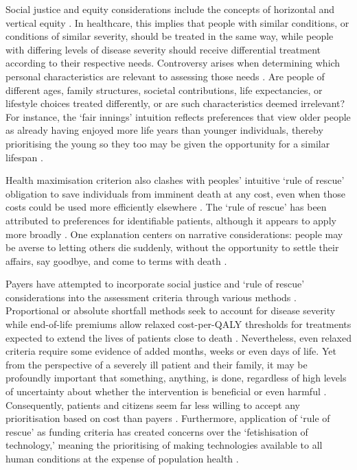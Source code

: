 \documentclass[11pt]{article}\usepackage[]{graphicx}\usepackage[]{xcolor}
\begin{document}
Social justice and equity considerations include the concepts of horizontal and vertical equity \parencite{ODonnell2008AnalyzingHealthEquity}. In healthcare, this implies that people with similar conditions, or conditions of similar severity, should be treated in the same way, while people with differing levels of disease severity should receive differential treatment according to their respective needs. Controversy arises when determining which personal characteristics are relevant to assessing those needs \parencite{ClarkWeale2012SocialValuesPrioritySetting}. Are people of different ages, family structures, societal contributions, life expectancies, or lifestyle choices treated differently, or are such characteristics deemed irrelevant? For instance, the ‘fair innings’ intuition reflects preferences that view older people as already having enjoyed more life years than younger individuals, thereby prioritising the young so they too may be given the opportunity for a similar lifespan \parencite{Oliver2009FairTestFairInnings, Watters2016FairInningsEmpiricalPerspective, Adler2025FairInnings}.

Health maximisation criterion also clashes with peoples’ intuitive ‘rule of rescue’ obligation to save individuals from imminent death at any cost, even when those costs could be used more efficiently elsewhere \parencite{Cookson2008RuleOfRescue, Sinclair2022a, Andrade2025EthicalShortcomingsQALY}. The ‘rule of rescue’ has been attributed to preferences for identifiable patients, although it appears to apply more broadly \parencite{McKie2003, Sinclair2022a}. One explanation centers on narrative considerations: people may be averse to letting others die suddenly, without the opportunity to settle their affairs, say goodbye, and come to terms with death \parencite{Sinclair2022a}.


Payers have attempted to incorporate social justice and ‘rule of rescue’ considerations into the assessment criteria through various methods \parencite{Cookson2008RuleOfRescue, Dukhanin2018IntegratingSocialJustice, Mahdiani2024QALYStillQALY}. Proportional or absolute shortfall methods seek to account for disease severity \parencite{Mahdiani2024QALYStillQALY} while end-of-life premiums allow relaxed cost-per-QALY thresholds for treatments expected to extend the lives of patients close to death \parencite{Olofsson2018EndOfLifePremiumCancer}. Nevertheless, even relaxed criteria require some evidence of added months, weeks or even days of life. Yet from the perspective of a severely ill patient and their family, it may be profoundly important that something, anything, is done, regardless of high levels of uncertainty about whether the intervention is beneficial or even harmful \parencite{ClarkWeale2012SocialValuesPrioritySetting, MacLeod2016HighCostCancerDrugsReview}. Consequently, patients and citizens seem far less willing to accept any prioritisation based on cost than payers \parencite{MacLeod2016HighCostCancerDrugsReview}. Furthermore, application of ‘rule of rescue’ as funding criteria has created concerns over the ‘fetishisation of technology,’ meaning the prioritising of making technologies available to all human conditions at the expense of population health \parencite{Cookson2008RuleOfRescue}.
\end{document}
